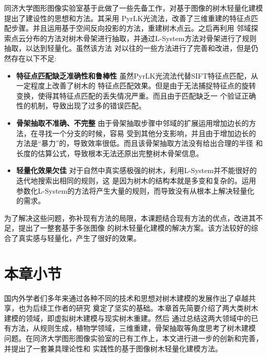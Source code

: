 同济大学图形图像实验室基于此做了一些先备工作，对基于图像的树木轻量化建模提出了建设性的思想和方法。其采用
PyrLK光流法，改善了三维重建的特征点匹配步骤。并且运用基于空间反向投影的方法，重建树木点云。之后再利用
邻域探索点云分布的方法对树木骨架进行抽取，并通过L-System方法对骨架进行了规则抽取，以达到轻量化。虽然该方法
对以往的一些方法进行了完善和改进，但是仍然存在以下不足:\\
\begin{itemize}
	\item \textbf{特征点匹配缺乏准确性和鲁棒性} 虽然PyrLK光流法代替SIFT特征点匹配，从一定程度上改善了树木的
		特征点匹配效果。但是由于无法捕捉特征点的旋转变换，使得其特征点匹配的丢失情况严重。而且由于匹配缺乏一
		个验证正确性的机制，导致出现了过多的错误匹配。
	\item \textbf{骨架抽取不准确、不完整} 由于骨架抽取步骤中邻域的扩展运用增加边长的方法，在寻找一个分支的时候，容易
		受到其他分支影响，并且由于增加边长的方法是“暴力”的，导致效率很低。而且该骨架抽取方法没有给出合理的半径
		和长度的估算公式，导致根本无法还原出完整树木骨架信息。
	\item \textbf{轻量化效果欠佳} 对于自然中真实感极强的树木，利用L-System并不能很好的迭代地搜索出相同的规则，这
		是因为树木的结构本就是多变和复杂的。运用参数化L-System的方法将产生大量的规则，而导致没有从根本上解决轻量化
		的需求。
\end{itemize}

为了解决这些问题，弥补现有方法的局限，本课题结合现有方法的优点，改进其不足，提出了一整套基于多张图像
的树木轻量化建模的解决方案。该方法较好的综合了真实感与轻量化，产生了很好的效果。

\section{本章小节}
国内外学者们多年来通过各种不同的技术和思想对树木建模的发展作出了卓越共享，也为后续工作者的研究
奠定了坚实的基础。本章首先简要介绍了两大类树木建模的领域，即虚拟树木建模与现实树木重建。然后
通过总结这两大领域中的已有方法，从规则生成，植物学领域，三维重建，骨架抽取等角度思考了树木建模
问题。在同济大学图形图像实验室的已有工作上，本文进行进一步的创新和完善，并提出了一套兼具理论性和
实践性的基于图像树木轻量化建模方法。
